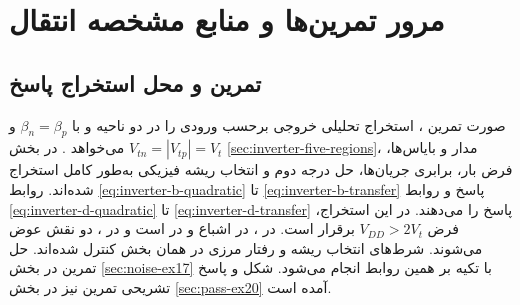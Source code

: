 \chapter*{مرور تمرین‌ها و منابع مشخصه انتقال }
\section*{تمرین  و محل استخراج پاسخ}
\label{sec:booklet-three-ex16}
صورت تمرین ، استخراج تحلیلی خروجی برحسب ورودی را در
دو ناحیه  و  با
\(\beta_n=\beta_p\) و \(V_{tn}=|V_{tp}|=V_t\) می‌خواهد
\cite[صفحه چاپی ۹۷]{weste}.
در بخش \ref{sec:inverter-five-regions}، مدار و بایاس‌ها،
فرض بار، برابری جریان‌ها، حل درجه دوم و انتخاب ریشه فیزیکی
به‌طور کامل استخراج شده‌اند. روابط
\eqref{eq:inverter-b-quadratic} تا
\eqref{eq:inverter-b-transfer} پاسخ  و روابط
\eqref{eq:inverter-d-quadratic} تا
\eqref{eq:inverter-d-transfer} پاسخ  را می‌دهند.
در این استخراج، فرض \(V_{DD}>2V_t\) برقرار است.
در ،  در اشباع و  در
 است و در ، دو نقش عوض می‌شوند.
شرط‌های انتخاب ریشه و رفتار مرزی در همان بخش کنترل شده‌اند.
حل تمرین  در بخش \ref{sec:noise-ex17} با تکیه بر همین
روابط انجام می‌شود. شکل و پاسخ تشریحی تمرین  نیز در
بخش \ref{sec:pass-ex20} آمده است.

